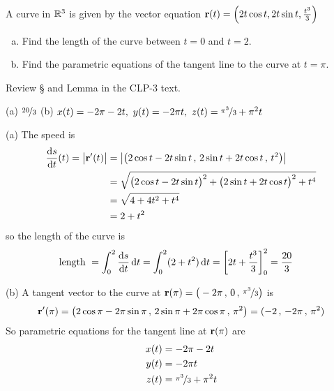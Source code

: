 \begin{question}[M317 2011D] %
A curve in $\mathbb{R}^3$ is given by the vector equation 
$\mathbf{r}(t) = \left(2t \cos t, 2t \sin t,\frac{t^3}{3}\right)$

\begin{enumerate}[(a)]
\item
Find the length of the curve between $t = 0$ and $t = 2$.

\item
Find the parametric equations of the tangent line to the curve at $t = \pi$.

\end{enumerate}
\end{question}

\begin{hint} 
Review \S{} and  Lemma  
in the CLP-3 text.
\end{hint}

\begin{answer} 
(a) $\nicefrac{20}{3}$\qquad
(b) $x(t) = -2\pi -2t,\ 
     y(t) =  -2\pi t,\ 
     z(t) = \nicefrac{\pi^3}{3} + \pi^2 t$ 
\end{answer}

\begin{solution} (a) The speed is
\begin{align*}
\diff{s}{t}(t)
=\big|\vr'(t)\big| & = \left|\left(2\cos t - 2t\sin t\,,\,
                                  2\sin t + 2t \cos t\,,\,
                                  t^2\right)\right| \\
                  &=\sqrt{\big(2\cos t - 2t\sin t\big)^2
                         +\big(2\sin t + 2t \cos t\big)^2
                         +t^4} \\
                 &= \sqrt{4+ 4t^2 +t^4} \\
                 &= 2+t^2
\end{align*}
so the length of the curve is
\begin{align*}
\text{length }
&=\int_0^2 \diff{s}{t}\,\dee{t}
  =\int_0^2 (2+t^2)\,\dee{t}
  = \left[2t +\frac{t^3}{3}\right]_0^2
  =\frac{20}{3}
\end{align*}

\noindent (b)
A tangent vector to the curve at 
$\mathbf{r}(\pi)=\big(-2\pi\,,\, 0\,,\, \nicefrac{\pi^3}{3}\big)$ is
\begin{equation*}
\mathbf{r}'(\pi) = \left(2\cos\pi - 2\pi\sin\pi\,,\,
                                  2\sin\pi + 2\pi \cos\pi\,,\,
                                  \pi^2\right)
 = (-2\,,\,-2\pi\,,\,\pi^2)
\end{equation*}
So parametric equations for the tangent line at $\mathbf{r}(\pi)$ are
\begin{align*}
x(t) &= -2\pi -2t \\
y(t) &=  -2\pi t \\
z(t) &= \nicefrac{\pi^3}{3} + \pi^2 t 
\end{align*}
\end{solution}

